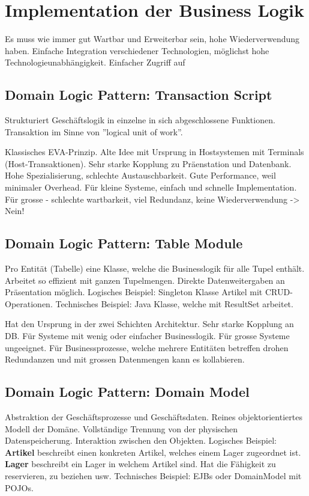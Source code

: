 \section{Implementation der Business Logik}
Es muss wie immer gut Wartbar und Erweiterbar sein, hohe Wiederverwendung haben. Einfache Integration verschiedener Technologien, möglichst hohe Technologieunabhängigkeit. Einfacher Zugriff auf 

\subsection{Domain Logic Pattern: Transaction Script}
Strukturiert Geschäftslogik in einzelne in sich abgeschlossene Funktionen. Transaktion im Sinne von ''logical unit of work''.

Klassisches EVA-Prinzip. Alte Idee mit Ursprung in Hostsystemen mit Terminals (Host-Transaktionen). Sehr starke Kopplung zu Präenstation und Datenbank. Hohe Spezialisierung, schlechte Austauschbarkeit. Gute Performance, weil minimaler Overhead. Für kleine Systeme, einfach und schnelle Implementation. Für grosse - schlechte wartbarkeit, viel Redundanz, keine Wiederverwendung -> Nein!

\subsection{Domain Logic Pattern: Table Module}
Pro Entität (Tabelle) eine Klasse, welche die Businesslogik für alle Tupel enthält. Arbeitet so effizient mit ganzen Tupelmengen. Direkte Datenweitergaben an Präsentation möglich. Logisches Beispiel: Singleton Klasse Artikel mit CRUD-Operationen. Technisches Beispiel: Java Klasse, welche mit ResultSet arbeitet.

Hat den Ursprung in der zwei Schichten Architektur. Sehr starke Kopplung an DB. Für Systeme mit wenig oder einfacher Businesslogik. Für grosse Systeme ungeeignet. Für Businessprozesse, welche mehrere Entitäten betreffen drohen Redundanzen und mit grossen Datenmengen kann es kollabieren.

\subsection{Domain Logic Pattern: Domain Model}
Abstraktion der Geschäftsprozesse und Geschäftsdaten. Reines objektorientiertes Modell der Domäne. Vollständige Trennung von der physischen Datenspeicherung. Interaktion zwischen den Objekten. Logisches Beispiel: \textbf{Artikel} beschreibt einen konkreten Artikel, welches einem Lager zugeordnet ist. \textbf{Lager} beschreibt ein Lager in welchem Artikel sind. Hat die Fähigkeit zu reservieren, zu beziehen usw.
Technisches Beispiel: EJBs oder DomainModel mit POJOs.

